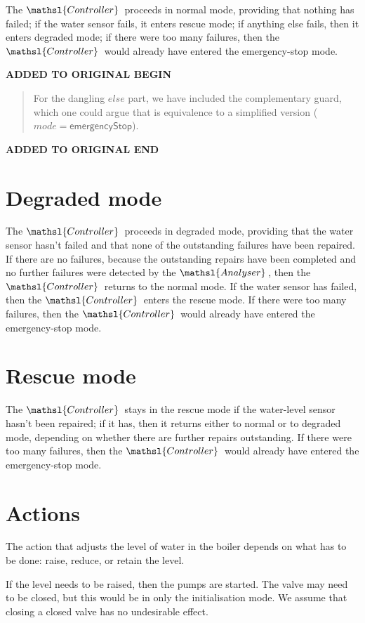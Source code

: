 \documentclass{report}
\renewcommand{\freetype}[1]{\mathsf{#1}}
\newcommand{\freetypeemergencyStop }{\freetype{emergencyStop}}
\newenvironment{addedstuff}{\begin{flushleft}\textbf{ADDED TO ORIGINAL BEGIN}\begin{quote}\begin{minipage}{.8\textwidth}}{\end{minipage}\end{quote}\textbf{ADDED TO ORIGINAL END}\end{flushleft}}
\begin{document}
The \( \mathsl{Controller} \, \)\/ proceeds in normal mode, providing
that nothing has failed; if the water sensor fails, it enters rescue
mode; if anything else fails, then it enters degraded mode; if there
were too many failures, then the \( \mathsl{Controller} \, \)\/ would
already have entered the emergency-stop mode.

\begin{addedstuff}
   For the dangling $else$ part, we have included the complementary guard, which one could
   argue that is equivalence to a simplified version ($mode = \freetypeemergencyStop$).
\end{addedstuff}

\section{Degraded mode}

The \( \mathsl{Controller} \, \)\/ proceeds in degraded mode,
providing that the water sensor hasn't failed and that none of the
outstanding failures have been repaired.  If there are no failures,
because the outstanding repairs have been completed and no further
failures were detected by the \( \mathsl{Analyser} \, \), then the \(
\mathsl{Controller} \, \)\/ returns to the normal mode.  If the water
sensor has failed, then the \( \mathsl{Controller} \, \)\/ enters the
rescue mode.  If there were too many failures, then the \(
\mathsl{Controller} \, \)\/ would already have entered the
emergency-stop mode.

\section{Rescue mode}

The \( \mathsl{Controller} \, \)\/ stays in the rescue mode if the
water-level sensor hasn't been repaired; if it has, then it returns
either to normal or to degraded mode, depending on whether there are
further repairs outstanding.  If there were too many failures, then
the \( \mathsl{Controller} \, \)\/ would already have entered the
emergency-stop mode.

\section{Actions}

The action that adjusts the level of water in the boiler depends on
what has to be done: raise, reduce, or retain the level.

If the level needs to be raised, then the pumps are started.  The
valve may need to be closed, but this would be in only the
initialisation mode.  We assume that closing a closed valve has no
undesirable effect.
\end{document}
